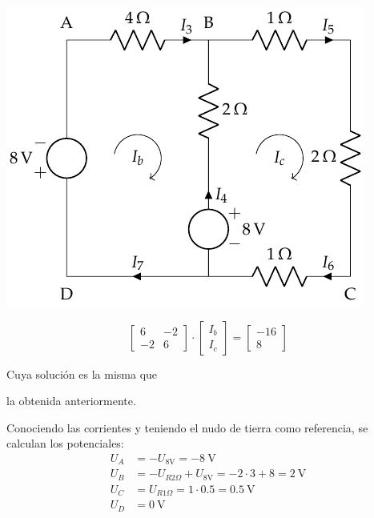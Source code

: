 \vspace{4mm}
\begin{minipage}{0.6\linewidth}
    \begin{center}
    \includegraphics[scale=1]{figuras/BT1_11_mod2.pdf}
    \end{center}
\end{minipage}
\hfill
\begin{minipage}{0.3\linewidth}
    \begin{equation*}
      \begin{bmatrix}
        6 & -2  \\
        -2 & 6
      \end{bmatrix} \cdot
      \begin{bmatrix}
        I_b\\
        I_c
      \end{bmatrix} = %
      \begin{bmatrix}
        -16\\
        8
      \end{bmatrix}
    \end{equation*}

    \vspace{6mm}
    
    Cuya solución es la misma que 
    
    la obtenida anteriormente.
\end{minipage}

\vspace{4mm}
Conociendo las corrientes y teniendo el nudo de tierra como referencia, se calculan los potenciales:
\begin{align*}
  U_A&=-U_{8\si{\volt}}= \boxed{\qty{-8}{\volt}}\\
  U_B&=-U_{R2\Omega}+U_{8\si{\volt}}=-2\cdot 3+8= \boxed{\qty{2}{\volt}}\\
  U_C&=U_{R1\Omega}=1\cdot 0.5= \boxed{\qty{0.5}{\volt}}\\
  U_D&= \boxed{\qty{0}{\volt}}
\end{align*}

